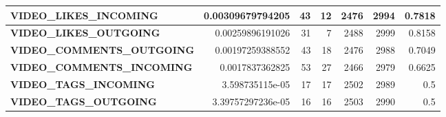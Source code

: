 \documentclass[letterpaper]{article}
\begin{document}
\begin{figure}
\begin{table}
\begin{tabular}{| >{\small}l | >{\small}r | >{\small}r | >{\small}r | >{\small}r | >{\small}r | >{\small}r |}
	\hline
	\textbf{VIDEO\_LIKES\_INCOMING}& 0.00309679794205 & 43 & 12 & 2476 & 2994 & 0.7818\\
	\hline
	\textbf{VIDEO\_LIKES\_OUTGOING}& 0.00259896191026 & 31 & 7 & 2488 & 2999 & 0.8158\\
	\hline
	\textbf{VIDEO\_COMMENTS\_OUTGOING}& 0.00197259388552 & 43 & 18 & 2476 & 2988 & 0.7049\\
	\hline
	\textbf{VIDEO\_COMMENTS\_INCOMING}& 0.0017837362825 & 53 & 27 & 2466 & 2979 & 0.6625\\
	\hline
	\textbf{VIDEO\_TAGS\_INCOMING}& 3.598735115e-05 & 17 & 17 & 2502 & 2989 & 0.5 \\
	\hline
	\textbf{VIDEO\_TAGS\_OUTGOING}& 3.39757297236e-05 & 16 & 16 & 2503 & 2990 & 0.5\\
	\hline
	\end{tabular}
\end{table}



\cleardoublepage


\end{figure}
\end{document}
